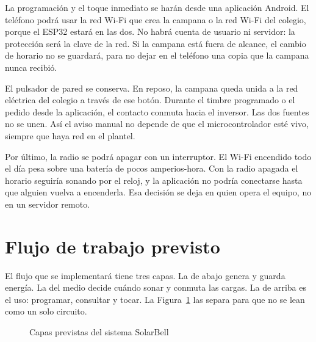 \documentclass[12pt,letterpaper]{article}
\begin{document}
La programación y el toque inmediato se harán desde una aplicación Android. El teléfono podrá usar la red Wi-Fi que crea la campana o la red Wi-Fi del colegio, porque el ESP32 estará en las dos. No habrá cuenta de usuario ni servidor: la protección será la clave de la red. Si la campana está fuera de alcance, el cambio de horario no se guardará, para no dejar en el teléfono una copia que la campana nunca recibió.

El pulsador de pared se conserva. En reposo, la campana queda unida a la red eléctrica del colegio a través de ese botón. Durante el timbre programado o el pedido desde la aplicación, el contacto conmuta hacia el inversor. Las dos fuentes no se unen. Así el aviso manual no depende de que el microcontrolador esté vivo, siempre que haya red en el plantel.

Por último, la radio se podrá apagar con un interruptor. El Wi-Fi encendido todo el día pesa sobre una batería de pocos amperios-hora. Con la radio apagada el horario seguiría sonando por el reloj, y la aplicación no podría conectarse hasta que alguien vuelva a encenderla. Esa decisión se deja en quien opera el equipo, no en un servidor remoto.

\section*{Flujo de trabajo previsto}

El flujo que se implementará tiene tres capas. La de abajo genera y guarda energía. La del medio decide cuándo sonar y conmuta las cargas. La de arriba es el uso: programar, consultar y tocar. La Figura~\ref{fig:capas} las separa para que no se lean como un solo circuito.

\begin{figure}[H]
\centering
\singlespacing
{}
\caption{Capas previstas del sistema SolarBell}
\label{fig:capas}
\end{figure}
\end{document}
